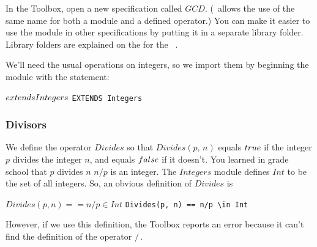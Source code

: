 In the Toolbox, open a new specification called $GCD$.  (\tlaplus\
allows the use of the same name for both a module and a defined
operator.)  
You can make it easier to use the module in other specifications
by putting it in a separate library folder.  Library folders
are explained on the
for the \tlaplus\
  .

We'll need the usual operations on integers, so we import
them by beginning the module with the statement:
\begin{display}
\begin{twocols}
$\EXTENDS Integers$
 \midcol
\verb|EXTENDS Integers|
\end{twocols}
\end{display}


%
\vspace{-\baselineskip}%
\subsubsection{Divisors}

We define the operator $Divides$ so that $Divides(p,\,n)$ equals
$\TRUE$ if the integer $p$ divides the integer $n$, and equals
$\FALSE$ if it doesn't.  You learned in grade school that $p$ divides
$n$ \popref{iff}{iff} $n/p$ is an integer.  The $Integers$ module
defines $Int$ to be the set of all integers.  So, an obvious
definition of $Divides$ is
\begin{display}
\begin{twocols}
$Divides(p, n)== n/p \in Int$
\midcol
\verb|Divides(p, n) == n/p \in Int|
\end{twocols}
\end{display}
However, if we use this definition, the Toolbox reports an error
because it can't find the definition of the operator $/$\,.

